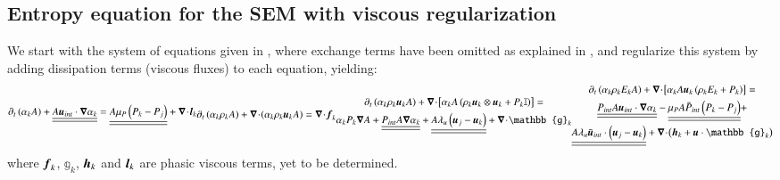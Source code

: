 \subsection{Entropy equation for the SEM with viscous regularization}\label{sec:ent-equ-sem}
%
We start with the system of equations given in , where exchange terms have been omitted as explained in 
, and regularize this system by adding dissipation terms (viscous fluxes) to each equation, yielding:
%
\begin{subequations}\label{eq:sev_equ-with-diss-terms}
\begin{align}\label{eq:sev_equ-with-diss-terms-vf}
\partial_t \left( \alpha_k  A\right) + \underline{\underline{A \mbold u_{int} \cdot \grad \alpha_k}} = \underline{\underline{A \mu_P \left( P_k - P_j \right)}} + \div \mbold l_k 
\end{align}
\begin{align}\label{eq:sev_equ-with-diss-terms-cont}
\partial_t \left( \alpha_k \rho_k A \right) + \div \left( \alpha_k \rho_k \mbold u_k A \right) = \div \mbold f_k
\end{align}
%
\begin{multline}\label{eq:sev_equ-with-diss-terms-mom}
\partial_t \left( \alpha_k \rho_k \mbold u_k A \right) + \div \left[ \alpha_k A \left( \rho_k \mbold u_k \otimes \mbold u_k + P_k \mathbb{I} \right) \right] =\\
\alpha_k P_k \grad A + \underline{\underline{P_{int} A \grad \alpha_k}} + \underline{\underline{A \lambda_u \left( \mbold u_j - \mbold u_k \right)}} + \div \mathbb{g}_k
\end{multline}
%
\begin{multline}\label{eq:sev_equ-with-diss-terms-ener}
\partial_t \left( \alpha_k \rho_k E_k A \right) + \div \left[ \alpha_k A \mbold u_k \left( \rho_k E_k + P_k \right) \right] = \\
\underline{\underline{P_{int} A \mbold u_{int} \cdot \grad \alpha_k}} -
\underline{\underline{\mu_P A  \bar{P}_{int} \left( P_k-P_j \right)}} + \\
\underline{\underline{A \lambda_u \bar{\mbold u}_{int} \cdot \left( \mbold u_j - \mbold u_k \right)}}
+ \div \left( \mbold h_k + \mbold u \cdot \mathbb{g}_k \right)
\end{multline}
\end{subequations}
%
where $\boldsymbol f_k$, $\mathbb{g}_k$, $\boldsymbol h_k$ and $\boldsymbol l_k$ are phasic viscous terms, yet to be determined. 
